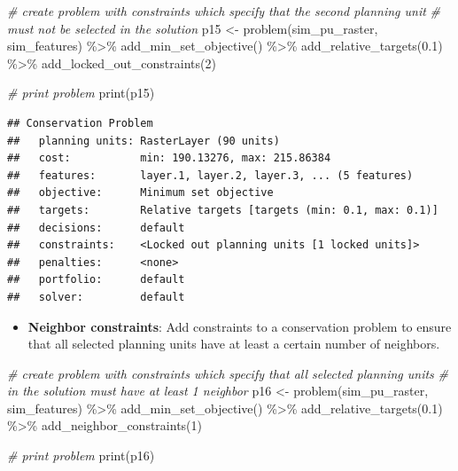 \documentclass[
  12pt,
]{book}
\newenvironment{Shaded}{\begin{snugshade}}{\end{snugshade}}
\newcommand{\CommentTok}[1]{\textcolor[rgb]{0.56,0.35,0.01}{\textit{#1}}}
\newcommand{\DecValTok}[1]{\textcolor[rgb]{0.00,0.00,0.81}{#1}}
\newcommand{\FloatTok}[1]{\textcolor[rgb]{0.00,0.00,0.81}{#1}}
\newcommand{\FunctionTok}[1]{\textcolor[rgb]{0.00,0.00,0.00}{#1}}
\newcommand{\NormalTok}[1]{#1}
\newcommand{\OtherTok}[1]{\textcolor[rgb]{0.56,0.35,0.01}{#1}}
\newcommand{\SpecialCharTok}[1]{\textcolor[rgb]{0.00,0.00,0.00}{#1}}
\providecommand{\tightlist}{%
  \setlength{\itemsep}{0pt}\setlength{\parskip}{0pt}}
\begin{document}
\begin{Shaded}
\begin{Highlighting}[]
\CommentTok{\# create problem with constraints which specify that the second planning unit}
\CommentTok{\# must not be selected in the solution}
\NormalTok{p15 }\OtherTok{\textless{}{-}} \FunctionTok{problem}\NormalTok{(sim\_pu\_raster, sim\_features) }\SpecialCharTok{\%\textgreater{}\%}
  \FunctionTok{add\_min\_set\_objective}\NormalTok{() }\SpecialCharTok{\%\textgreater{}\%}
  \FunctionTok{add\_relative\_targets}\NormalTok{(}\FloatTok{0.1}\NormalTok{) }\SpecialCharTok{\%\textgreater{}\%}
  \FunctionTok{add\_locked\_out\_constraints}\NormalTok{(}\DecValTok{2}\NormalTok{)}

\CommentTok{\# print problem}
\FunctionTok{print}\NormalTok{(p15)}
\end{Highlighting}
\end{Shaded}

\begin{verbatim}
## Conservation Problem
##   planning units: RasterLayer (90 units)
##   cost:           min: 190.13276, max: 215.86384
##   features:       layer.1, layer.2, layer.3, ... (5 features)
##   objective:      Minimum set objective 
##   targets:        Relative targets [targets (min: 0.1, max: 0.1)]
##   decisions:      default
##   constraints:    <Locked out planning units [1 locked units]>
##   penalties:      <none>
##   portfolio:      default
##   solver:         default
\end{verbatim}

\begin{itemize}
\tightlist
\item
  \textbf{Neighbor constraints}: Add constraints to a conservation problem to ensure that all selected planning units have at least a certain number of neighbors.
\end{itemize}

\begin{Shaded}
\begin{Highlighting}[]
\CommentTok{\# create problem with constraints which specify that all selected planning units}
\CommentTok{\# in the solution must have at least 1 neighbor}
\NormalTok{p16 }\OtherTok{\textless{}{-}} \FunctionTok{problem}\NormalTok{(sim\_pu\_raster, sim\_features) }\SpecialCharTok{\%\textgreater{}\%}
  \FunctionTok{add\_min\_set\_objective}\NormalTok{() }\SpecialCharTok{\%\textgreater{}\%}
  \FunctionTok{add\_relative\_targets}\NormalTok{(}\FloatTok{0.1}\NormalTok{) }\SpecialCharTok{\%\textgreater{}\%}
  \FunctionTok{add\_neighbor\_constraints}\NormalTok{(}\DecValTok{1}\NormalTok{)}

\CommentTok{\# print problem}
\FunctionTok{print}\NormalTok{(p16)}
\end{Highlighting}
\end{Shaded}
\end{document}

